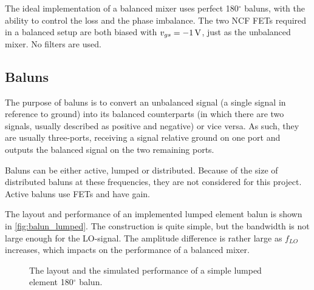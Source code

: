 			The ideal implementation of a balanced mixer uses perfect 180$^\circ$ baluns, with the ability to control the loss and the phase imbalance. The two NCF FETs required in a balanced setup are both biased with $v_{gs}=\unit[-1]{V}$, just as the unbalanced mixer. No filters are used.

		\subsection{Baluns}
			The purpose of baluns is to convert an unbalanced signal (a single signal in reference to ground) into its balanced counterparts (in which there are two signals, usually described as positive and negative) or vice versa. As such, they are usually three-ports, receiving a signal relative ground on one port and outputs the balanced signal on the two remaining ports.
	
			Baluns can be either active, lumped or distributed. Because of the size of distributed baluns at these frequencies, they are not considered for this project. Active baluns use FETs and have gain.
	
			The layout and performance of an implemented lumped element balun is shown in \autoref{fig:balun_lumped}.\autocite{kuylenstierna04} The construction is quite simple, but the bandwidth is not large enough for the LO-signal. The amplitude difference is rather large as $f_{LO}$ increases, which impacts on the performance of a balanced mixer.
	
			\begin{figure}[hpt!]
				\centering 
				\caption{ The layout and  the simulated performance of a simple lumped element 180$^\circ$ balun.}\label{fig:balun_lumped}
			\end{figure}
%			

